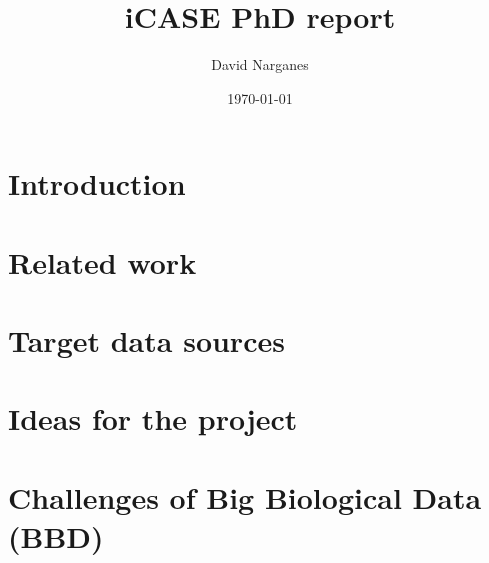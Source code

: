 \documentclass[a4paper]{article}
\title{iCASE PhD report}
\author{David Narganes}
\date{\today}
\begin{document}
\maketitle
\tableofcontents
\newpage

\section{Introduction}

\newpage

\section{Related work}

\newpage

\section{Target data sources}

\newpage

\section{Ideas for the project}

\newpage

\section{Challenges of Big Biological Data (BBD)}




\end{document}
